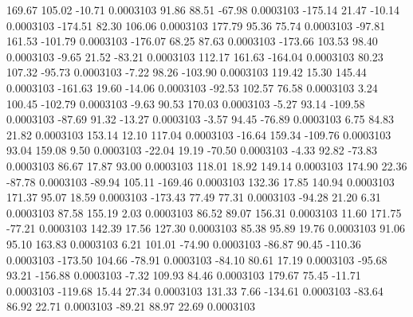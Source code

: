       169.67      105.02      -10.71     0.0003103
       91.86       88.51      -67.98     0.0003103
     -175.14       21.47      -10.14     0.0003103
     -174.51       82.30      106.06     0.0003103
      177.79       95.36       75.74     0.0003103
      -97.81      161.53     -101.79     0.0003103
     -176.07       68.25       87.63     0.0003103
     -173.66      103.53       98.40     0.0003103
       -9.65       21.52      -83.21     0.0003103
      112.17      161.63     -164.04     0.0003103
       80.23      107.32      -95.73     0.0003103
       -7.22       98.26     -103.90     0.0003103
      119.42       15.30      145.44     0.0003103
     -161.63       19.60      -14.06     0.0003103
      -92.53      102.57       76.58     0.0003103
        3.24      100.45     -102.79     0.0003103
       -9.63       90.53      170.03     0.0003103
       -5.27       93.14     -109.58     0.0003103
      -87.69       91.32      -13.27     0.0003103
       -3.57       94.45      -76.89     0.0003103
        6.75       84.83       21.82     0.0003103
      153.14       12.10      117.04     0.0003103
      -16.64      159.34     -109.76     0.0003103
       93.04      159.08        9.50     0.0003103
      -22.04       19.19      -70.50     0.0003103
       -4.33       92.82      -73.83     0.0003103
       86.67       17.87       93.00     0.0003103
      118.01       18.92      149.14     0.0003103
      174.90       22.36      -87.78     0.0003103
      -89.94      105.11     -169.46     0.0003103
      132.36       17.85      140.94     0.0003103
      171.37       95.07       18.59     0.0003103
     -173.43       77.49       77.31     0.0003103
      -94.28       21.20        6.31     0.0003103
       87.58      155.19        2.03     0.0003103
       86.52       89.07      156.31     0.0003103
       11.60      171.75      -77.21     0.0003103
      142.39       17.56      127.30     0.0003103
       85.38       95.89       19.76     0.0003103
       91.06       95.10      163.83     0.0003103
        6.21      101.01      -74.90     0.0003103
      -86.87       90.45     -110.36     0.0003103
     -173.50      104.66      -78.91     0.0003103
      -84.10       80.61       17.19     0.0003103
      -95.68       93.21     -156.88     0.0003103
       -7.32      109.93       84.46     0.0003103
      179.67       75.45      -11.71     0.0003103
     -119.68       15.44       27.34     0.0003103
      131.33        7.66     -134.61     0.0003103
      -83.64       86.92       22.71     0.0003103
      -89.21       88.97       22.69     0.0003103

